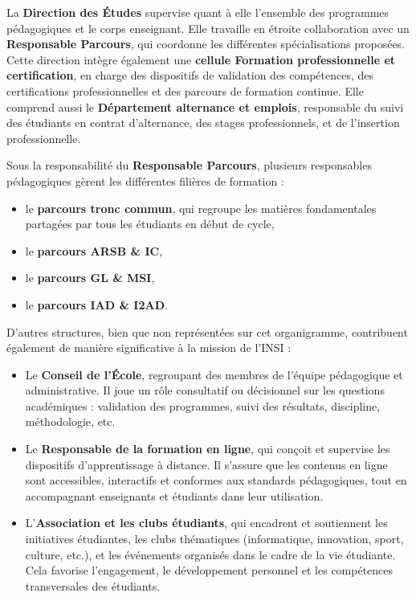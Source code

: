 \documentclass[a4paper,12pt, oneside]{article}
\begin{document}
La \textbf{Direction des Études} supervise quant à elle l’ensemble des programmes pédagogiques et le corps enseignant. Elle travaille en étroite collaboration avec un \textbf{Responsable Parcours}, qui coordonne les différentes spécialisations proposées. Cette direction intègre également une \textbf{cellule Formation professionnelle et certification}, en charge des dispositifs de validation des compétences, des certifications professionnelles et des parcours de formation continue. Elle comprend aussi le \textbf{Département alternance et emplois}, responsable du suivi des étudiants en contrat d’alternance, des stages professionnels, et de l’insertion professionnelle.

Sous la responsabilité du \textbf{Responsable Parcours}, plusieurs responsables pédagogiques gèrent les différentes filières de formation :
\begin{itemize}
    \item le \textbf{parcours tronc commun}, qui regroupe les matières fondamentales partagées par tous les étudiants en début de cycle,
    \item le \textbf{parcours ARSB \& IC},
    \item le \textbf{parcours GL \& MSI},
    \item le \textbf{parcours IAD \& I2AD}.
\end{itemize}

D’autres structures, bien que non représentées sur cet organigramme, contribuent également de manière significative à la mission de l’INSI :
\begin{itemize}
    \item Le \textbf{Conseil de l’École}, regroupant des membres de l’équipe pédagogique et administrative. Il joue un rôle consultatif ou décisionnel sur les questions académiques : validation des programmes, suivi des résultats, discipline, méthodologie, etc.
    \item Le \textbf{Responsable de la formation en ligne}, qui conçoit et supervise les dispositifs d’apprentissage à distance. Il s’assure que les contenus en ligne sont accessibles, interactifs et conformes aux standards pédagogiques, tout en accompagnant enseignants et étudiants dans leur utilisation.
    \item L’\textbf{Association et les clubs étudiants}, qui encadrent et soutiennent les initiatives étudiantes, les clubs thématiques (informatique, innovation, sport, culture, etc.), et les événements organisés dans le cadre de la vie étudiante. Cela favorise l’engagement, le développement personnel et les compétences transversales des étudiants.
\end{itemize}
\end{document}
